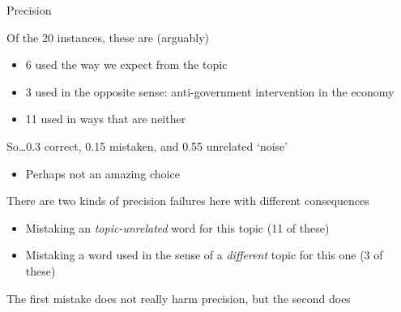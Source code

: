 \documentclass{hertieteaching}
\begin{document}
\begin{frame}{Precision}

Of the 20 instances, these are (arguably)
\begin{itemize}
  \item 6 used the way we expect from the topic
  \item 3 used in the opposite sense: anti-government intervention in the economy
  \item 11 used in ways that are neither
\end{itemize}

So\ldots 0.3 correct, 0.15 mistaken, and 0.55 unrelated `noise'
\begin{itemize}
  \item Perhaps not an amazing choice
\end{itemize}

There are two kinds of precision failures here with different consequences
\begin{itemize}
  \item Mistaking an \textit{topic-unrelated} word for this topic (11 of these)
  \item Mistaking a word used in the sense of a \textit{different} topic for this one (3 of these)
\end{itemize}

The first mistake does not really harm precision, but the second does

\end{frame}
\end{document}
